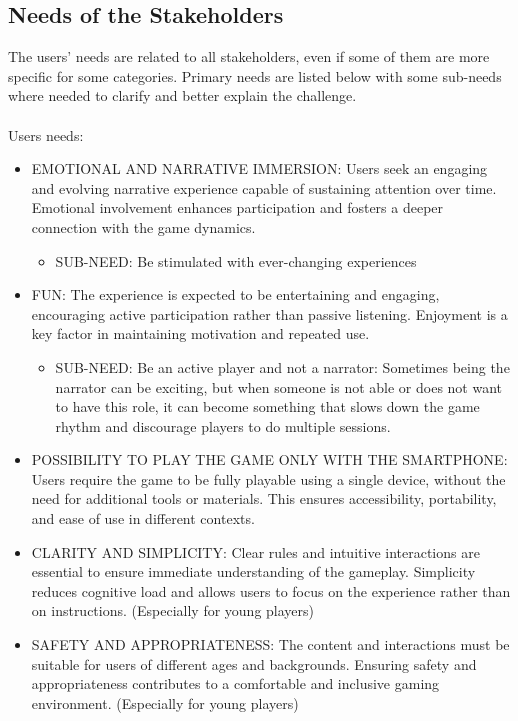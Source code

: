 \documentclass[12pt]{article}
\begin{document}
\subsection{Needs of the Stakeholders}
The users' needs are related to all stakeholders, even if some of them are more specific for some categories. 
Primary needs are listed below with some sub-needs where needed to clarify and better explain the challenge.
\\
\\Users needs:
\begin{itemize}
    \item EMOTIONAL AND NARRATIVE IMMERSION: Users seek an engaging and evolving narrative experience capable of sustaining attention over time. Emotional involvement enhances participation and fosters a deeper connection with the game dynamics.
    \begin{itemize} 
    \item SUB-NEED: Be stimulated with ever-changing experiences
    \end{itemize}
    \item FUN: The experience is expected to be entertaining and engaging, encouraging active participation rather than passive listening. Enjoyment is a key factor in maintaining motivation and repeated use.
    \begin{itemize} 
    \item SUB-NEED: Be an active player and not a narrator: Sometimes being the narrator can be exciting, but when someone is not able or does not want to have this role, it can become something that slows down the game rhythm and discourage players to do multiple sessions.
    \end{itemize}
    \item POSSIBILITY TO PLAY THE GAME ONLY WITH THE SMARTPHONE: Users require the game to be fully playable using a single device, without the need for additional tools or materials. This ensures accessibility, portability, and ease of use in different contexts.
    \item CLARITY AND SIMPLICITY: Clear rules and intuitive interactions are essential to ensure immediate understanding of the gameplay. Simplicity reduces cognitive load and allows users to focus on the experience rather than on instructions. (Especially for young players)
    \item SAFETY AND APPROPRIATENESS: The content and interactions must be suitable for users of different ages and backgrounds. Ensuring safety and appropriateness contributes to a comfortable and inclusive gaming environment. (Especially for young players)
\end{itemize}
\end{document}
